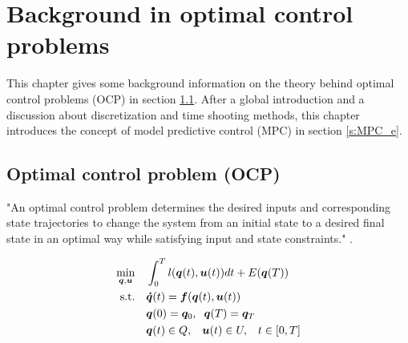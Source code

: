 \chapter{Background in optimal control problems}
\label{cha:OCP}
This chapter gives some background information on the theory behind optimal control problems (OCP) in section \ref{Optimal control problem (OCP)}. After a global introduction and a discussion about discretization and time shooting methods, this chapter introduces the concept of model predictive control (MPC) in section \ref{s:MPC_e}.

\section{Optimal control problem (OCP)}
\label{Optimal control problem (OCP)}
"An optimal control problem determines the desired inputs and corresponding state trajectories to change the system from an initial state to a desired final state in an optimal way while satisfying input and state constraints." \cite{Mercy2018}.

\begin{equation}
\label{eq:OCP}
\begin{aligned}
\min_{\bm{q},\bm{u}} \quad & \int_{0}^{T}l(\bm{q}(t),\bm{u}(t))dt + E(\bm{q}(T)) \\
\textrm{s.t.} \quad & \bm{\dot{q}}(t) = \bm{f}(\bm{q}(t), \bm{u}(t))\\
& \bm{q}(0)= \bm{q}_{0},\hspace{2 mm}\bm{q}(T)= \bm{q}_{T}    \\
& \bm{q}(t)\in Q,\hspace{3 mm} \bm{u}(t)\in U, \hspace{3 mm} t\in [0, T]
\end{aligned}
\end{equation}

